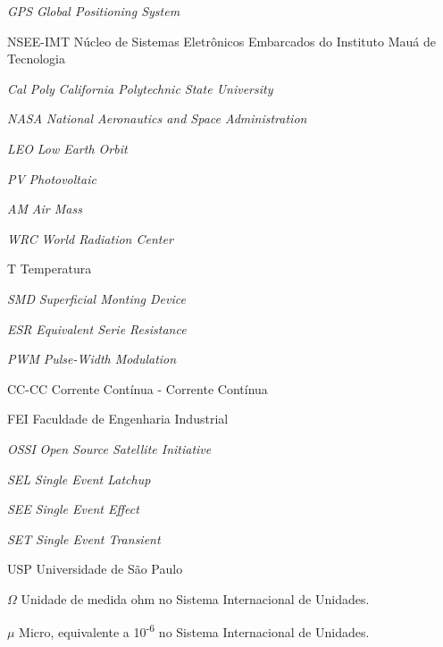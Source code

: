 \documentclass[
	12pt,				%
	openright,			%
	oneside,			%
	a4paper,			%
	english,			%
	french,				%
	spanish,			%
	brazil,				%
	oldfontcommands
	]{abntex2}
\begin{document}
\begin{siglas}

  \item[\textit{GPS}] \textit{Global Positioning System}
  \item[NSEE-IMT] Núcleo de Sistemas Eletrônicos Embarcados do Instituto Mauá de Tecnologia
  \item[\textit{Cal Poly}] \textit{California Polytechnic State University}
  \item[\textit{NASA}] \textit{National Aeronautics and Space Administration}
  \item[\textit{LEO}] \textit{Low Earth Orbit}
  \item[\textit{PV}] \textit{Photovoltaic}
  \item[\textit{AM}] \textit{Air Mass}
  \item[\textit{WRC}] \textit{World Radiation Center}
  \item[T] Temperatura
  \item[\textit{SMD}] \textit{Superficial Monting Device}
  \item[\textit{ESR}] \textit{Equivalent Serie Resistance}
  \item[\textit{PWM}] \textit{Pulse-Width Modulation}
  \item[CC-CC] Corrente Contínua - Corrente Contínua
  \item[FEI] Faculdade de Engenharia Industrial
  \item[\textit{OSSI}] \textit{Open Source Satellite Initiative}
  \item[\textit{SEL}]\textit{Single Event Latchup}
  \item[\textit{SEE}]\textit{Single Event Effect}
  \item[\textit{SET}]\textit{Single Event Transient}
  \item[USP] Universidade de São Paulo
      
\end{siglas}

\begin{simbolos}
  \item[$ \Omega $] Unidade de medida ohm no Sistema Internacional de Unidades.
  \item[$ \mu $] Micro, equivalente a 10\textsuperscript{-6} no Sistema Internacional de Unidades.
\end{simbolos}
\end{document}

